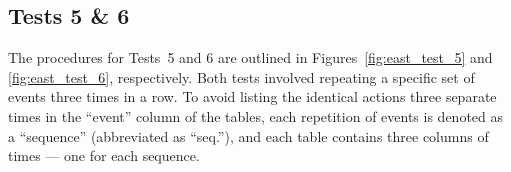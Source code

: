 \subsection{Tests 5 \& 6}
The procedures for Tests~5 and 6 are outlined in Figures~\ref{fig:east_test_5} and \ref{fig:east_test_6}, respectively. Both tests involved repeating a specific set of events three times in a row. To avoid listing the identical actions three separate times in the ``event'' column of the tables, each repetition of events is denoted as a ``sequence'' (abbreviated as ``seq.''), and each table contains three columns of times --- one for each sequence.


